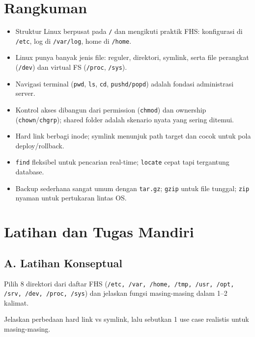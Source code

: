 \section{Rangkuman}
\label{sec:summary-filesystem}

\begin{itemize}
    \item Struktur Linux berpusat pada \texttt{/} dan mengikuti praktik FHS: konfigurasi di \texttt{/etc}, log di \texttt{/var/log}, home di \texttt{/home}.
    \item Linux punya banyak jenis file: reguler, direktori, symlink, serta file perangkat (\texttt{/dev}) dan virtual FS (\texttt{/proc}, \texttt{/sys}).
    \item Navigasi terminal (\texttt{pwd}, \texttt{ls}, \texttt{cd}, \texttt{pushd/popd}) adalah fondasi administrasi server.
    \item Kontrol akses dibangun dari permission (\texttt{chmod}) dan ownership (\texttt{chown}/\texttt{chgrp}); shared folder adalah skenario nyata yang sering ditemui.
    \item Hard link berbagi inode; symlink menunjuk path target dan cocok untuk pola deploy/rollback.
    \item \texttt{find} fleksibel untuk pencarian real-time; \texttt{locate} cepat tapi tergantung database.
    \item Backup sederhana sangat umum dengan \texttt{tar.gz}; \texttt{gzip} untuk file tunggal; \texttt{zip} nyaman untuk pertukaran lintas OS.
\end{itemize}

\section{Latihan dan Tugas Mandiri}
\label{sec:exercises-filesystem}

\subsection*{A. Latihan Konseptual}
\begin{exercisebox}[4.A]
Pilih 8 direktori dari daftar FHS (\texttt{/etc, /var, /home, /tmp, /usr, /opt, /srv, /dev, /proc, /sys})
dan jelaskan fungsi masing-masing dalam 1--2 kalimat.
\end{exercisebox}

\begin{exercisebox}[4.B]
Jelaskan perbedaan hard link vs symlink, lalu sebutkan 1 use case realistis untuk masing-masing.
\end{exercisebox}

